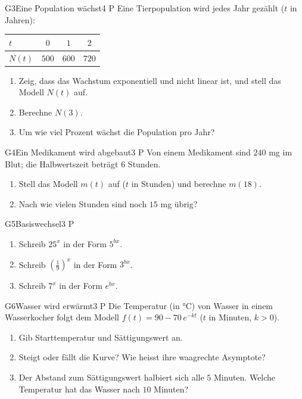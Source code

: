 \documentclass[11pt]{article}
\begin{document}
\begin{lpaufgabe}{G3}{Eine Population wächst}{4 P}
Eine Tierpopulation wird jedes Jahr gezählt ($t$ in Jahren):
\begin{center}\begin{tabular}{l|ccc}
$t$ & $0$ & $1$ & $2$\\\hline
$N(t)$ & $500$ & $600$ & $720$
\end{tabular}\end{center}
\begin{enumerate}[label=(\alph*),leftmargin=*,itemsep=1pt]
\item Zeig, dass das Wachstum exponentiell und nicht linear ist, und stell das Modell $N(t)$ auf.
\item Berechne $N(3)$.
\item Um wie viel Prozent wächst die Population pro Jahr?
\end{enumerate}
\end{lpaufgabe}

\begin{lpaufgabe}{G4}{Ein Medikament wird abgebaut}{3 P}
Von einem Medikament sind $240$ mg im Blut; die Halbwertszeit beträgt $6$ Stunden.
\begin{enumerate}[label=(\alph*),leftmargin=*,itemsep=1pt]
\item Stell das Modell $m(t)$ auf ($t$ in Stunden) und berechne $m(18)$.
\item Nach wie vielen Stunden sind noch $15$ mg übrig?
\end{enumerate}
\end{lpaufgabe}


\begin{lpaufgabe}{G5}{Basiswechsel}{3 P}
\begin{enumerate}[label=(\alph*),leftmargin=*,itemsep=1pt]
\item Schreib $25^{x}$ in der Form $5^{b x}$.
\item Schreib $\left(\tfrac19\right)^{x}$ in der Form $3^{b x}$.
\item Schreib $7^{x}$ in der Form $e^{b x}$.
\end{enumerate}
\end{lpaufgabe}

\begin{lpaufgabe}{G6}{Wasser wird erwärmt}{3 P}
Die Temperatur (in °C) von Wasser in einem Wasserkocher folgt dem Modell $f(t) = 90 - 70\,e^{-k t}$ ($t$ in Minuten, $k > 0$).
\begin{enumerate}[label=(\alph*),leftmargin=*,itemsep=1pt]
\item Gib Starttemperatur und Sättigungswert an.
\item Steigt oder fällt die Kurve? Wie heisst ihre waagrechte Asymptote?
\item Der Abstand zum Sättigungswert halbiert sich alle $5$ Minuten. Welche Temperatur hat das Wasser nach $10$ Minuten?
\end{enumerate}
\end{lpaufgabe}
\end{document}

